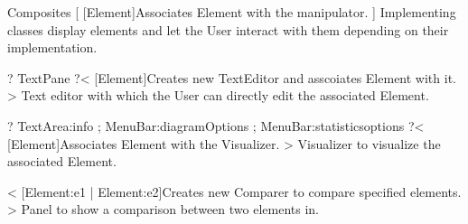 \begin{package}{Composites}
    [
        [Element]{Associates Element with the manipulator.}
    ]{
        Implementing classes display elements and let the User interact with them depending on their implementation.
    }

    ?
        TextPane
    ?<
        [Element]{Creates new TextEditor and asscoiates Element with it.}
    >{
        Text editor with which the User can directly edit the associated Element.
    }

    ?
        TextArea:info ;
        MenuBar:diagramOptions ;
        MenuBar:statisticsoptions
    ?<
        [Element]{Associates Element with the Visualizer.}
    >{
        Visualizer to visualize the associated Element.
    }

    <
        [Element:e1 | Element:e2]{Creates new Comparer to compare specified elements.}
    >{
        Panel to show a comparison between two elements in.
    }

   
\end{package}